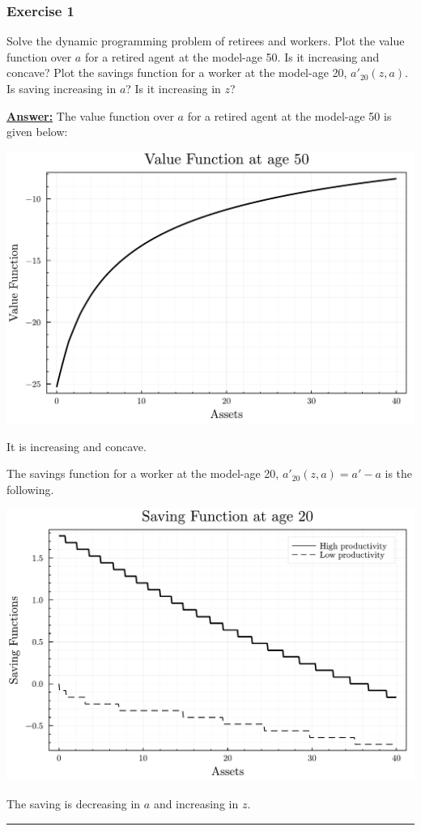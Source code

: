 \documentclass{article} %
\theoremstyle{definition}
\newenvironment{solution}[1][Answer]{\begin{singlespace}\underline{\textbf{#1:}}\quad }{\ \rule{0.3em}{0.3em}\end{singlespace}} %
\begin{document}
\subsubsection*{Exercise 1}
Solve the dynamic programming problem of retirees and workers. Plot the value function over $ a $ for a retired agent at the model-age 50. Is it increasing and concave? Plot the savings function for a worker at the model-age 20, $ a'_{20}(z, a) $. Is saving increasing in $ a $? Is it increasing in $ z $?
\begin{solution}
  The value function over $ a $ for a retired agent at the model-age 50 is given below:
  \begin{center}
    \includegraphics[width=0.7\linewidth]{../Figures/value_function50.pdf}
  \end{center}
  It is increasing and concave.
  
  The savings function for a worker at the model-age 20, $ a'_{20}(z, a) = a'-a $ is the following.
  \begin{center}
    \includegraphics[width=0.7\linewidth]{../Figures/savings_20.pdf}
  \end{center}
  The saving is decreasing in $a$ and increasing in $z$.
\end{solution}
\end{document}
